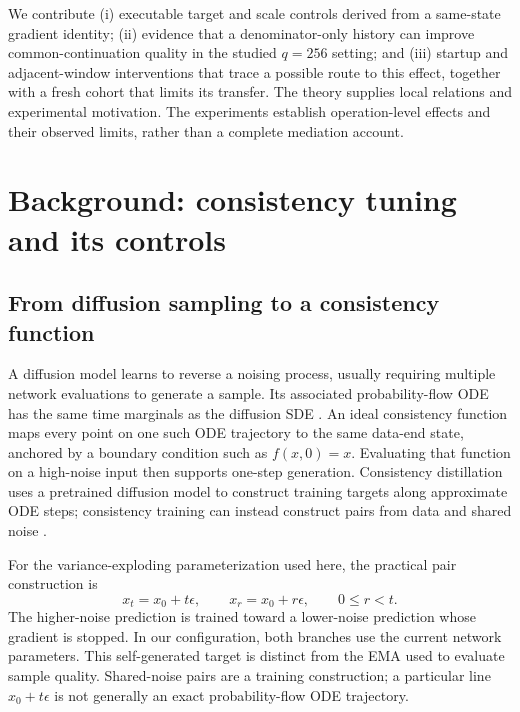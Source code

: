We contribute (i) executable target and scale controls derived from a same-state gradient identity; (ii) evidence that a denominator-only history can improve common-continuation quality in the studied $q=256$ setting; and (iii) startup and adjacent-window interventions that trace a possible route to this effect, together with a fresh cohort that limits its transfer. The theory supplies local relations and experimental motivation. The experiments establish operation-level effects and their observed limits, rather than a complete mediation account.

\section{Background: consistency tuning and its controls}
\label{sec:background}
\subsection{From diffusion sampling to a consistency function}
A diffusion model learns to reverse a noising process, usually requiring multiple network evaluations to generate a sample. Its associated probability-flow ODE has the same time marginals as the diffusion SDE \citep{song2021sde}. An ideal consistency function maps every point on one such ODE trajectory to the same data-end state, anchored by a boundary condition such as $f(x,0)=x$. Evaluating that function on a high-noise input then supports one-step generation. Consistency distillation uses a pretrained diffusion model to construct training targets along approximate ODE steps; consistency training can instead construct pairs from data and shared noise \citep{song2023consistency,song2024improved}.

For the variance-exploding parameterization used here, the practical pair construction is
\begin{equation}
 x_t=x_0+t\epsilon,\qquad x_r=x_0+r\epsilon,\qquad 0\leq r<t.
 \label{eq:pair}
\end{equation}
The higher-noise prediction is trained toward a lower-noise prediction whose gradient is stopped. In our configuration, both branches use the current network parameters. This self-generated target is distinct from the EMA used to evaluate sample quality. Shared-noise pairs are a training construction; a particular line $x_0+t\epsilon$ is not generally an exact probability-flow ODE trajectory.

